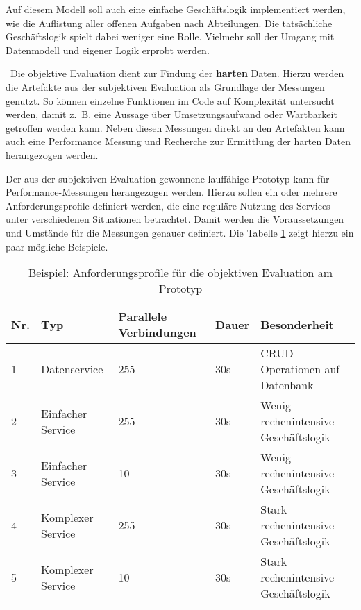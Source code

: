 
Auf diesem Modell soll auch eine einfache Geschäftslogik implementiert werden, wie die Auflistung aller offenen Aufgaben nach Abteilungen. Die tatsächliche Geschäftslogik spielt dabei weniger eine Rolle. Vielmehr soll der Umgang mit Datenmodell und eigener Logik erprobt werden.

	
\
Die objektive Evaluation dient zur Findung der \textbf{harten} Daten. Hierzu werden die Artefakte aus der subjektiven Evaluation als Grundlage der Messungen genutzt. So können einzelne Funktionen im Code auf Komplexität untersucht werden, damit z.~B. eine Aussage über Umsetzungsaufwand oder Wartbarkeit getroffen werden kann. Neben diesen Messungen direkt an den Artefakten kann auch eine Performance Messung und Recherche zur Ermittlung der harten Daten herangezogen werden. 


Der aus der subjektiven Evaluation gewonnene lauffähige Prototyp kann für Performance-Messungen herangezogen werden. Hierzu sollen ein oder mehrere Anforderungsprofile definiert werden, die eine reguläre Nutzung des Services unter verschiedenen Situationen betrachtet. Damit werden die Voraussetzungen und Umstände für die Messungen genauer definiert. Die Tabelle \ref{Anforderungsprofile} zeigt hierzu ein paar mögliche Beispiele. 

\begin{table}[!h]
	\centering
	\begin{tabular}{p{1cm}p{4cm}p{2cm}p{2cm}p{4cm}}
		\textbf{Nr.} & \textbf{Typ} & \textbf{Parallele Verbindungen} & 
		\textbf{Dauer} & \textbf{Besonderheit} \\
		\hline
		1 	& Datenservice 			& 255	&	30s		& CRUD Operationen auf Datenbank  \\
		\hline
		2	& Einfacher Service		& 255 	&	30s		& Wenig rechenintensive Geschäftslogik   \\
		\hline
		3	& Einfacher Service		& 10 	&	30s		& Wenig rechenintensive Geschäftslogik   \\
		\hline
		4	& Komplexer Service 	& 255	&	30s		& Stark rechenintensive Geschäftslogik  \\
		\hline
		5	& Komplexer Service 	& 10	&	30s		& Stark rechenintensive Geschäftslogik  \\
		\hline
	\end{tabular}
	\caption[Anforderungsprofile]{Beispiel: Anforderungsprofile für die objektiven Evaluation am Prototyp}
	\label{Anforderungsprofile}
\end{table}
\FloatBarrier

